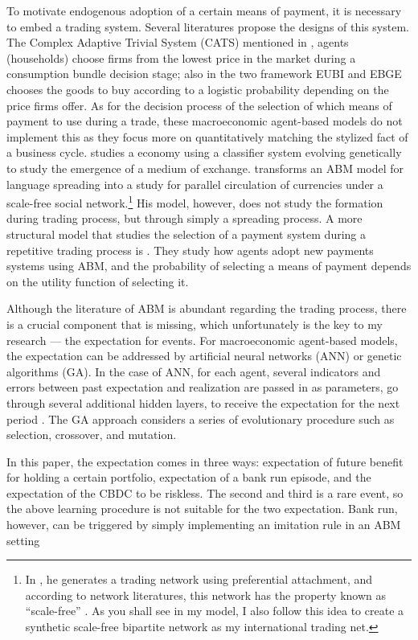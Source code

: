 To motivate endogenous adoption of a certain means of payment, it is necessary
to embed a trading system. Several literatures propose the designs of this
system. The Complex Adaptive Trivial System (CATS) mentioned in
\citet*{HandbookABM}, agents (households) choose firms from the lowest price in
the market during a consumption bundle decision stage; also in
\citet*{HandbookABM} the two framework EUBI and EBGE chooses the goods to buy
according to a logistic probability depending on the price firms offer. As for
the decision process of the selection of which means of payment to use during a
trade, these macroeconomic agent-based models do not implement this as they
focus more on quantitatively matching the stylized fact of a business cycle.
\citet*{Sargent90-MoneyAI} studies a \citet*{KW98} economy using a classifier
system evolving genetically to study the emergence of a medium of exchange.
\citet*{Manolis21} transforms an ABM model for language spreading into a study
for parallel circulation of currencies under a scale-free social
network.\footnote{In \citet*{Manolis21}, he generates a trading network using
preferential attachment, and according to network literatures, this network has
the property known as ``scale-free'' \citep*{Price1976}. As you shall see in my
model, I also follow this idea to create a synthetic scale-free bipartite
network as my international trading net.}
His model, however, does not study the formation during trading process, but through
simply a spreading process.
A more structural model that studies the selection of a payment system during a
repetitive trading process is \citet*{Trade_ABM_MOP2006}. They study how agents
adopt new payments systems using ABM, and the probability of selecting a
means of payment depends on the utility function of selecting it.

Although the literature of ABM is abundant regarding the trading process, there
is a crucial component that is missing, which unfortunately is the key to my
research --- the expectation for events. For macroeconomic agent-based models,
the expectation can be addressed by artificial neural networks (ANN) or genetic
algorithms (GA).  In the case of ANN, for each agent, several indicators and
errors between past expectation and realization are passed in as parameters, go
through several additional hidden layers, to receive the expectation for the
next period \citep*[see][]{Salle15-ABM_EXP}.  The GA approach considers a series of evolutionary 
procedure such as selection, crossover, and mutation\citep*[see][]{Arifovic18-GA_EXP}.

In this paper, the expectation comes in three ways: expectation of future benefit
for holding a certain portfolio, expectation of a bank run episode, and the
expectation of the CBDC to be riskless. The second and third is a rare event, so
the above learning procedure is not suitable for the two expectation.
Bank run, however, can be triggered by simply implementing an imitation rule in
an ABM setting~\citep*{Santos2021}